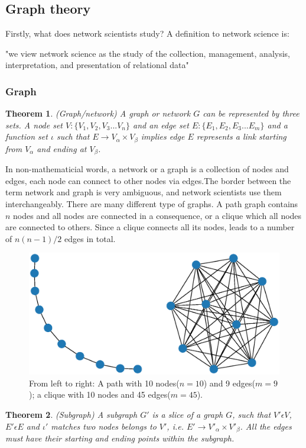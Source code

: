\documentclass[12pt]{article}
\newtheorem{theorem}{Theorem}[section]
\begin{document}
\subsection{Graph theory}
Firstly, what does network scientists study? A definition to network science is:\\
\begin{center}
    "we view network science as the study of the collection,
    management, analysis, interpretation, and presentation of relational data" \cite{brandes_robins_mccranie_wasserman_2013}
\end{center}

\subsubsection{Graph}
\begin{theorem}{(Graph/network)}
    A graph or network $G$ can be represented by three sets. A node set $V:\{V_1,V_2,V_3...V_n\}$ and an edge set $E:\{E_1,E_2,E_3...E_m\}$ and a function set $\iota$ such that $E\rightarrow V_\alpha\times V_\beta$ implies edge $E$ represents a link starting from $V_\alpha$ and ending at $V_\beta$.
\end{theorem}
In non-mathematicial words, a network or a graph is a collection of nodes and edges, each node can connect to other nodes via edges.The border between the term network and graph is very ambiguous, and network scientists use them interchangeably. There are many different type of graphs. A path graph contains $n$ nodes and all nodes are connected in a consequence, or a clique which all nodes are connected to others. Since a clique connects all its nodes, leads to a number of $n(n-1)/2$ edges in total.
\begin{figure}[!h]
    \includegraphics[width=\textwidth]{path_clique.eps}
    \caption{From left to right: A path with 10 nodes($n=10$) and 9 edges($m=9$); a clique with 10 nodes and 45 edges($m=45$).}
\end{figure}
\begin{theorem}{(Subgraph)}
    A subgraph $G'$ is a slice of a graph $G$, such that $V' \epsilon V$, $E' \epsilon E$ and $\iota'$ matches two nodes belongs to $V'$, i.e. $E'\rightarrow V'_\alpha\times V'_\beta $. All the edges must have their starting and ending points within the subgraph.
\end{theorem}
\end{document}
